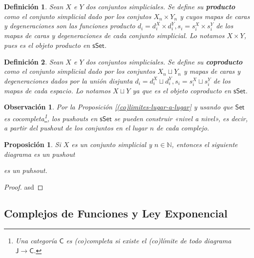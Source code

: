 \documentclass[11pt]{report}
\theoremstyle{colored}
\newtheorem{definition}{Definición}[section]
\newtheorem{proposition}{Proposición}[section]
\newtheorem{remark}{Observación}[section]
\newcommand{\N}{\mathbb{N}}
\newcommand{\cat}[1]{\mathsf{#1}}
\newcommand{\sk}{\mathsf{sk}}
\renewcommand{\ss}[1]{\Delta^{#1}}
\newcommand{\guill}[1]{«#1»}
\begin{document}
\begin{definition} Sean $X$ e $Y$ dos conjuntos simpliciales. Se define su \textbf{producto} como el conjunto simplicial dado por los conjutos $X_n \times Y_n$ y cuyos mapas de caras y degeneraciones son las funciones producto $d_i = d_i^X \times d_i^Y, s_i = s_i^X \times s_i^Y$ de los mapas de caras y degeneraciones de cada conjunto simplicial. Lo notamos $X \times Y$, pues es el objeto producto en $\cat{sSet}$.
\end{definition}

\begin{definition} Sean $X$ e $Y$ dos conjuntos simpliciales. Se define su \textbf{coproducto} como el conjunto simplicial dado por los conjuntos $X_n \sqcup Y_n$ y mapas de caras y degeneraciones dados por la unión disjunta $d_i = d_i^X \sqcup d_i^Y, s_i = s_i^X \sqcup s_i^Y$ de los mapas de cada espacio. Lo notamos $X \sqcup Y$ ya que es el objeto coproducto en $\cat{sSet}$.
\end{definition}

\begin{remark} Por la Proposición \ref{(co)limites-lugar-a-lugar} y usando que $\cat{Set}$ es cocompleta\footnote{Una categoría $\cat{C}$ es (co)completa si existe el (co)límite de todo diagrama $\cat{J} \to \cat{C}$.}, los pushouts en $\cat{sSet}$ se pueden construir \guill{nivel a nivel}, es decir, a partir del pushout de los conjuntos en el lugar $n$ de cada complejo.
\end{remark}

\begin{proposition}\label{sk-pushout} Si $X$ es un conjunto simplicial y $n \in \N$, entonces el siguiente diagrama es un pushout
\begin{center}
\end{center}
es un puhsout.
\end{proposition}
\begin{proof}asd
\end{proof}

\subsection{Complejos de Funciones y Ley Exponencial}
\end{document}
